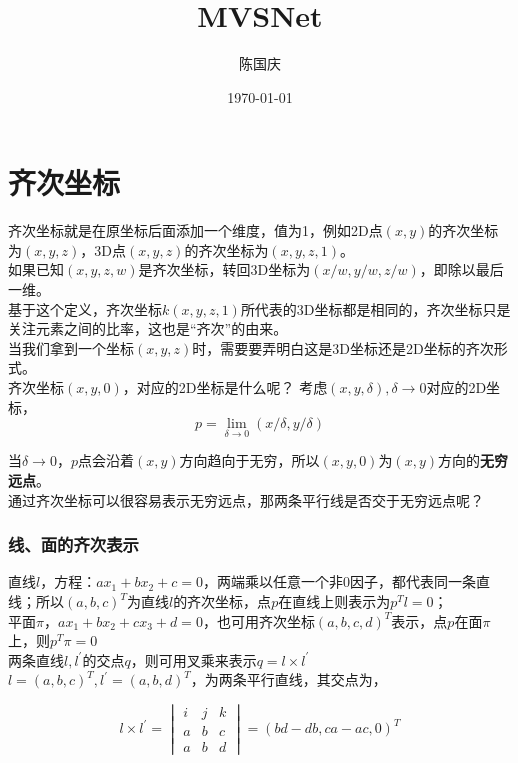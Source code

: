 \documentclass[hpyerref,UTF8,a4paper,titlepage,12pt,oneside]{ctexbook}
\title{MVSNet}
\author{陈国庆}
\date{\today}
\theoremstyle{definition}
\begin{document}
\maketitle
\tableofcontents

\section{齐次坐标}
	齐次坐标就是在原坐标后面添加一个维度，值为1，例如2D点$(x,y)$的齐次坐标为$(x,y,z)$，3D点$(x,y,z)$的齐次坐标为$(x,y,z,1)$。\\

	如果已知$(x,y,z,w)$是齐次坐标，转回3D坐标为$(x/w,y/w,z/w)$，即除以最后一维。\\

	基于这个定义，齐次坐标$k(x,y,z,1)$所代表的3D坐标都是相同的，齐次坐标只是关注元素之间的比率，这也是“齐次”的由来。\\

	当我们拿到一个坐标$(x,y,z)$时，需要要弄明白这是3D坐标还是2D坐标的齐次形式。\\

	齐次坐标$(x,y,0)$，对应的2D坐标是什么呢？ 考虑$(x,y,\delta), \delta\rightarrow 0$对应的2D坐标，
	$$
		p = \lim_{\delta\rightarrow 0} (x/\delta, y/\delta)
	$$

	当$\delta\rightarrow 0$，$p$点会沿着$(x,y)$方向趋向于无穷，所以$(x,y,0)$为$(x,y)$方向的\textbf{无穷远点}。\\

	通过齐次坐标可以很容易表示无穷远点，那两条平行线是否交于无穷远点呢？

	\subsubsection*{线、面的齐次表示}
		直线$l$，方程：$ax_1 + bx_2 +c =0$，两端乘以任意一个非0因子，都代表同一条直线；所以$(a,b,c)^T$为直线$l$的齐次坐标，点$p$在直线上则表示为$p^Tl = 0$；\\

		平面$\pi$，$ax_1 + bx_2 + cx_3 +d = 0$，也可用齐次坐标$(a,b,c,d)^T$表示，点$p$在面$\pi$上，则$p^T\pi = 0$\\

		两条直线$l,l^\prime$的交点$q$，则可用叉乘来表示$q = l\times l^\prime$\\

		$l=(a,b,c)^T, l^\prime = (a,b,d)^T$，为两条平行直线，其交点为，
		
		\begin{equation}
			l\times l^{\prime} = 
							\begin{vmatrix}
								i & j& k \\
								a & b& c\\
								a & b& d
							\end{vmatrix}
			= (bd-db, ca-ac, 0)^T
		\end{equation}
\end{document}
